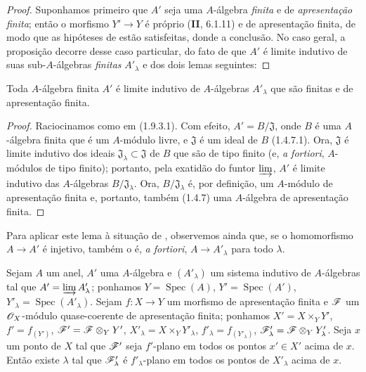 \begin{proof}
Suponhamos primeiro que
$A'$ seja uma $A$-álgebra
\emph{finita} e de
\emph{apresentação finita};
então o morfismo $Y'\to Y$
é próprio (\textbf{II},
6.1.11) e de apresentação
finita, de modo que as
hipóteses de
 estão
satisfeitas, donde a conclusão.
No caso geral, a proposição
decorre desse caso particular,
do fato de que $A'$ é limite
indutivo de suas
sub-$A$-álgebras \emph{finitas}
$A'_\lambda$ e dos dois
lemas seguintes:
\end{proof}

\begin{lemma}[11.5.5.1]
\label{IV.11.5.5.1}
Toda $A$-álgebra finita
$A'$ é limite indutivo
de $A$-álgebras
$A'_\lambda$ que são
finitas e de apresentação
finita.
\end{lemma}

\begin{proof}
Raciocinamos como em
(1.9.3.1). Com efeito,
$A'=B/\mathfrak J$, onde
$B$ é uma $A$-álgebra
finita que é um
$A$-módulo livre, e
$\mathfrak J$ é um ideal
de $B$ (1.4.7.1). Ora,
$\mathfrak J$ é limite
indutivo dos ideais
$\mathfrak J_\lambda
\subset\mathfrak J$ de
$B$ que são de tipo finito
(e, \emph{a fortiori},
$A$-módulos de tipo finito);
portanto, pela exatidão do
funtor $\varinjlim$,
$A'$ é limite indutivo das
$A$-álgebras
$B/\mathfrak J_\lambda$.
Ora, $B/\mathfrak J_\lambda$
é, por definição, um
$A$-módulo de apresentação
finita e, portanto, também
(1.4.7) uma $A$-álgebra
de apresentação finita.
\end{proof}


Para aplicar este lema à
situação de
, observemos
ainda que, se o homomorfismo
$A\to A'$ é injetivo,
também o é, \emph{a fortiori},
$A\to A'_\lambda$ para
todo $\lambda$.

\begin{lemma}[11.5.5.2]
\label{IV.11.5.5.2}
Sejam $A$ um anel,
$A'$ uma $A$-álgebra e
$(A'_\lambda)$ um sistema
indutivo de $A$-álgebras
tal que
$A'=\varinjlim A'_\lambda$;
ponhamos
$Y=\operatorname{Spec}(A)$,
$Y'=\operatorname{Spec}(A')$,
$Y'_\lambda=
\operatorname{Spec}(A'_\lambda)$.
Sejam $f:X\to Y$ um morfismo
de apresentação finita e
$\mathscr{F}$ um
$\mathscr{O}_X$-módulo
quase-coerente de apresentação
finita; ponhamos
$X'=X\times_Y Y'$,
$f'=f_{(Y')}$,
$\mathscr{F}'=\mathscr{F}\otimes_Y Y'$,
$X'_\lambda=X\times_Y Y'_\lambda$,
$f'_\lambda=f_{(Y'_\lambda)}$,
$\mathscr{F}'_\lambda=
\mathscr{F}\otimes_Y Y'_\lambda$.
Seja $x$ um ponto de $X$
tal que $\mathscr{F}'$ seja
$f'$-plano em todos os
pontos $x'\in X'$ acima de
$x$. Então existe $\lambda$
tal que $\mathscr{F}'_\lambda$
é $f'_\lambda$-plano em
todos os pontos de
$X'_\lambda$ acima de $x$.
\end{lemma}

